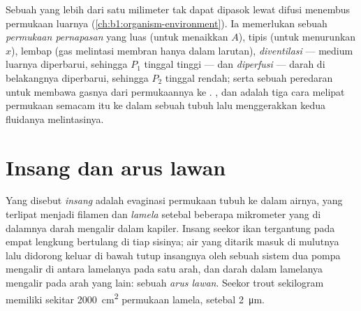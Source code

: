 \begin{proposition}\label{prop:b1:gas-exchange:requirements}
Sebuah  yang lebih dari satu milimeter tak dapat dipasok
lewat difusi menembus permukaan luarnya
(\cref{ch:b1:organism-environment}). Ia memerlukan sebuah
\emph{permukaan pernapasan} yang luas (untuk menaikkan $A$), tipis
(untuk menurunkan $x$), lembap (gas melintasi membran hanya dalam
larutan), \emph{diventilasi} --- medium luarnya diperbarui, sehingga
$P_1$ tinggal tinggi --- dan \emph{diperfusi} --- darah di belakangnya
diperbarui, sehingga $P_2$ tinggal rendah; serta sebuah peredaran untuk
membawa gasnya dari permukaannya ke . ,  dan
 adalah tiga cara melipat permukaan semacam itu ke dalam sebuah
tubuh lalu menggerakkan kedua fluidanya melintasinya.
\end{proposition}

\section{Insang dan arus lawan}

\begin{definition}[Insang]\label{def:b1:gas-exchange:gill}
Yang disebut \emph{insang} adalah evaginasi permukaan tubuh ke dalam
airnya, yang terlipat menjadi filamen dan \emph{lamela} setebal
beberapa mikrometer yang di dalamnya darah mengalir dalam kapiler.
Insang seekor ikan tergantung pada empat lengkung bertulang di tiap
sisinya; air yang ditarik masuk di mulutnya lalu didorong keluar di
bawah tutup insangnya oleh sebuah sistem dua pompa mengalir di antara
lamelanya pada satu arah, dan darah dalam lamelanya mengalir pada arah
yang lain: sebuah \emph{arus lawan}.
Seekor trout sekilogram memiliki sekitar \qty{2000}{cm^2} permukaan
lamela, setebal \qty{2}{\micro m}.
\end{definition}

